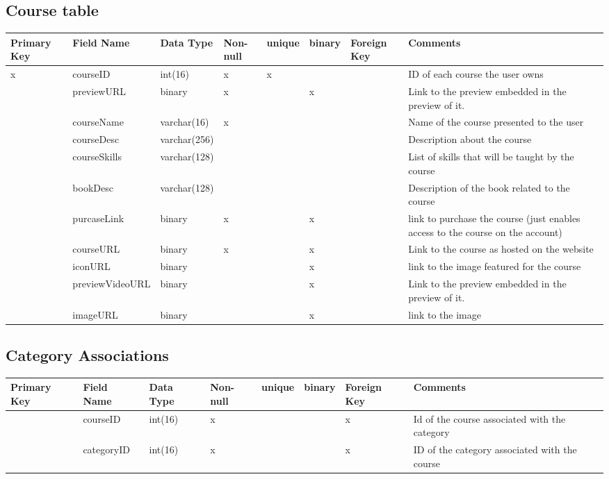 \documentclass{article}
\begin{document}
\subsection{Course table}
\begin{tabular}{|m{1cm} | m{2.75cm} | m{2cm}| m{1cm} | m{1cm}| m{1cm} | m{1cm}| m{3cm}| }
  \hline
  Primary Key & Field Name & Data Type & Non-null & unique & binary & Foreign Key & Comments\\ 
  \hline
  x & courseID & int(16) & x & x & & & ID of each course the user owns\\
  \hline
   & previewURL & binary & x & & x & & Link to the preview embedded in the preview of it.\\
  \hline
   & courseName & varchar(16) & x & & & & Name of the course presented to the user\\
  \hline
   & courseDesc & varchar(256) & & & & & Description about the course\\
  \hline
   & courseSkills & varchar(128) & & & & & List of skills that will be taught by the course\\
  \hline
   & bookDesc & varchar(128) & & & & & Description of the book related to the course\\
  \hline
   & purcaseLink & binary & x & & x & & link to purchase the course (just enables access to the course on the account)\\
  \hline
   & courseURL & binary & x & & x & & Link to the course as hosted on the website\\
  \hline
   & iconURL & binary & & & x & & link to the image featured for the course\\
  \hline
   & previewVideoURL & binary & & & x & & Link to the preview embedded in the preview of it.\\
  \hline
   & imageURL & binary & & & x & & link to the image\\
  \hline
\end{tabular}

\subsection{Category Associations}
\begin{tabular}{|m{1cm} | m{2cm} | m{1.5cm}| m{1cm} | m{1cm}| m{1cm} | m{1cm}| m{4cm}| }
  \hline
  Primary Key & Field Name & Data Type & Non-null & unique & binary & Foreign Key & Comments\\ 
  \hline
   & courseID & int(16) & x & & & x & Id of the course associated with the category\\
  \hline
   & categoryID & int(16) & x & & & x & ID of the category associated with the course\\
  \hline
\end{tabular}
\end{document}
